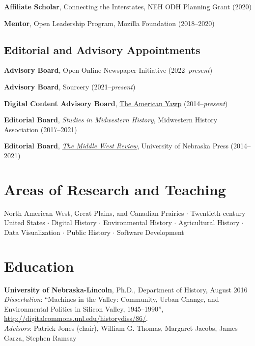 \documentclass[10pt]{article}
\begin{document}
\textbf{Affiliate Scholar}, Connecting the Interstates, NEH ODH Planning Grant (2020)

\textbf{Mentor}, Open Leadership Program, Mozilla Foundation (2018--2020)

\subsection*{Editorial and Advisory Appointments}

\textbf{Advisory Board}, Open Online Newspaper Initiative (2022--\textit{present})

\textbf{Advisory Board}, Sourcery (2021--\textit{present})

\textbf{Digital Content Advisory Board}, \href{http://www.americanyawp.com/}{The American Yawp} (2014--\textit{present})

\textbf{Editorial Board}, \textit{Studies in Midwestern History}, Midwestern History Association (2017--2021)

\textbf{Editorial Board}, \textit{\href{https://uimiddle.wordpress.com/}{The Middle West Review}}, University of Nebraska Press (2014--2021)


\section*{Areas of Research and Teaching}

North American West, Great Plains, and Canadian Prairies $\cdot$ Twentieth-century United States $\cdot$ Digital History $\cdot$ Environmental History $\cdot$ Agricultural History $\cdot$ Data Visualization $\cdot$ Public History $\cdot$ Software Development


\section*{Education}

\textbf{University of Nebraska-Lincoln}, Ph.D., Department of History, August 2016 \\
\textit{Dissertation}: ``Machines in the Valley: Community, Urban Change, and Environmental Politics in Silicon Valley, 1945--1990'', \url{http://digitalcommons.unl.edu/historydiss/86/}. \\
\textit{Advisors}: Patrick Jones (chair), William G. Thomas, Margaret Jacobs, James Garza, Stephen Ramsay
\end{document}
